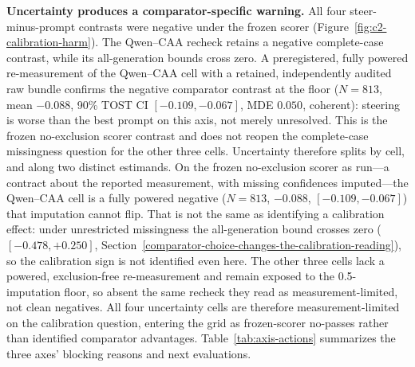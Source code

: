 \documentclass[manuscript,review,anonymous]{acmart}
\begin{document}
\textbf{Uncertainty produces a comparator-specific warning.} All four steer-minus-prompt contrasts were negative under the frozen scorer (Figure~\ref{fig:c2-calibration-harm}). The Qwen--CAA recheck retains a negative complete-case contrast, while its all-generation bounds cross zero. {}%
{}%
A preregistered, fully powered re-measurement of the Qwen--CAA cell with a retained, independently audited raw bundle confirms the negative comparator contrast at the floor (\(N=813\), mean \(-0.088\), 90\% TOST CI \([-0.109,-0.067]\), MDE \(0.050\), coherent): steering is worse than the best prompt on this axis, not merely unresolved. This is the frozen no-exclusion scorer contrast and does not reopen the complete-case missingness question for the other three cells. {}%
Uncertainty therefore splits by cell, and along two distinct estimands. On the frozen no-exclusion scorer as run---a contract about the reported measurement, with missing confidences imputed---the Qwen--CAA cell is a fully powered negative (\(N=813\), \(-0.088\), \([-0.109,-0.067]\)) that imputation cannot flip. That is not the same as identifying a calibration effect: under unrestricted missingness the all-generation bound crosses zero (\([-0.478,+0.250]\), Section~\ref{comparator-choice-changes-the-calibration-reading}), so the calibration sign is not identified even here. The other three cells lack a powered, exclusion-free re-measurement and remain exposed to the 0.5-imputation floor, so absent the same recheck they read as measurement-limited, not clean negatives. All four uncertainty cells are therefore measurement-limited on the calibration question, entering the grid as frozen-scorer no-passes rather than identified comparator advantages. Table~\ref{tab:axis-actions} summarizes the three axes' blocking reasons and next evaluations.
\end{document}
